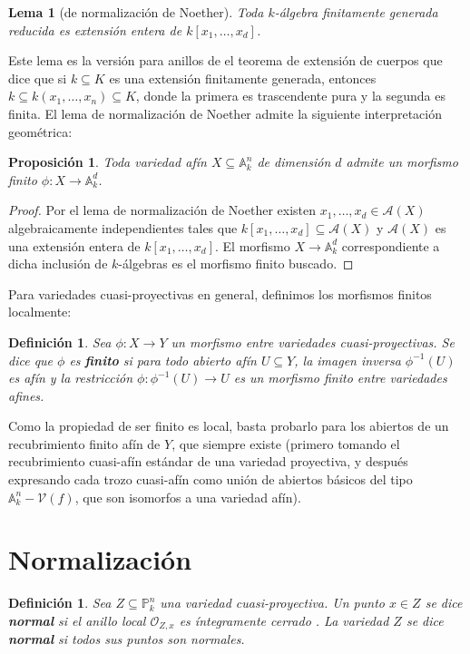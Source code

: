 \documentclass[a4paper,10pt]{book}
\newtheorem{lem}[thm]{Lema}
\newtheorem{prop}[thm]{Proposición}
\newtheorem{defn}[thm]{Definición}
\newcommand{\AAA}{\mathbb A}
\newcommand{\PP}{\mathbb P}
\newcommand{\Ank}{\AAA^n_k}
\newcommand{\Pnk}{\PP^n_k}
\newcommand{\calA}{{\mathcal A}}
\newcommand{\VV}{{\mathcal V}}
\begin{document}
\begin{lem}[de normalización de Noether] Toda $k$-álgebra finitamente generada reducida es extensión entera de $k[x_1,\dots,x_d]$. 
\end{lem}

Este lema es la versión para anillos de el teorema de extensión de cuerpos que dice que si $k\subseteq K$ es una extensión finitamente generada, entonces $k\subseteq k(x_1,\dots,x_n)\subseteq K$, donde la primera es trascendente pura y la segunda es finita.
El lema de normalización de Noether admite la siguiente interpretación geométrica:

\begin{prop}
 Toda variedad afín $X\subseteq\Ank$ de dimensión $d$ admite un morfismo finito $\phi:X\to\AAA^d_k$.
\end{prop}

\begin{proof}
 Por el lema de normalización de Noether \cite[4.6]{reid} existen $x_1,\ldots,x_d\in\calA(X)$ algebraicamente independientes tales que $k[x_1,\ldots,x_d]\subseteq\calA(X)$ y $\calA(X)$ es una extensión entera de $k[x_1,\ldots,x_d]$. El morfismo $X\to\AAA^d_k$ correspondiente a dicha inclusión de $k$-álgebras es el morfismo finito buscado.
\end{proof}


Para variedades cuasi-proyectivas en general, definimos los morfismos finitos localmente:

\begin{defn}
 Sea $\phi:X\to Y$ un morfismo entre variedades cuasi-proyectivas. Se dice que $\phi$ es {\bf finito} si para todo abierto afín $U\subseteq Y$, la imagen inversa $\phi^{-1}(U)$ es afín y la restricción $\phi:\phi^{-1}(U)\to U$ es un morfismo finito entre variedades afines. 
\end{defn}

Como la propiedad de ser finito es local, basta probarlo para los abiertos de un recubrimiento finito afín de $Y$, que siempre existe (primero tomando el recubrimiento cuasi-afín estándar de una variedad proyectiva, y después expresando cada trozo cuasi-afín como unión de abiertos básicos del tipo $\Ank-\VV(f)$, que son isomorfos a una variedad afín). 

 
\section{Normalización}

\begin{defn}
 Sea $Z\subseteq\Pnk$ una variedad cuasi-proyectiva. Un punto $x\in Z$ se dice {\bf normal} si el anillo local ${\mathcal O}_{Z,x}$ es íntegramente cerrado \cite[Capítulo 5]{am}. La variedad $Z$ se dice {\bf normal} si todos sus puntos son normales.
\end{defn}
\end{document}
